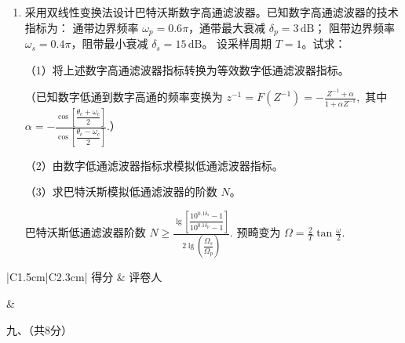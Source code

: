 \documentclass[UTF8,a4paper,12pt]{ctexart}
\begin{document}
\begin{enumerate}[label={}, leftmargin=2em, itemsep=1.6em]

\item 采用双线性变换法设计巴特沃斯数字高通滤波器。已知数字高通滤波器的技术指标为：
通带边界频率 $\omega_p=0.6\pi$，通带最大衰减 $\delta_p=3\,\mathrm{dB}$；
阻带边界频率 $\omega_s=0.4\pi$，阻带最小衰减 $\delta_s=15\,\mathrm{dB}$。
设采样周期 $T=1$。试求：

（1）将上述数字高通滤波器指标转换为等效数字低通滤波器指标。

（已知数字低通到数字高通的频率变换为
$
z^{-1}=F(Z^{-1})
=-\frac{Z^{-1}+\alpha}{1+\alpha Z^{-1}},
$
其中
$
\alpha
=
-\frac{
\cos\left[\dfrac{\theta_c+\omega_c}{2}\right]
}{
\cos\left[\dfrac{\theta_c-\omega_c}{2}\right]
}.
$）


（2）由数字低通滤波器指标求模拟低通滤波器指标。

（3）求巴特沃斯模拟低通滤波器的阶数 $N$。

巴特沃斯低通滤波器阶数
$
N\geq
\frac{
\lg\left[
\dfrac{10^{0.1\delta_s}-1}{10^{0.1\delta_p}-1}
\right]
}{
2\lg\left(\dfrac{\Omega_s}{\Omega_p}\right)
}.
$
预畸变为
$
\Omega=\frac{2}{T}\tan\frac{\omega}{2}.
$

\newpage


\end{enumerate}

\noindent
\begin{minipage}[t]{0.25\textwidth}
\renewcommand{\arraystretch}{1.5}
\begin{tabular}{|C{1.5cm}|C{2.3cm}|}
\hline
得分 & 评卷人 \\
\hline
\rule{0pt}{0.8cm}&  \\
\hline
\end{tabular}
\end{minipage}
\begin{minipage}[t]{0.72\textwidth}
\vspace{0.2cm}
\begin{center}
{\heiti 九、（共8分）}
\end{center}
\end{minipage}

\vspace{1.2em}
\end{document}
